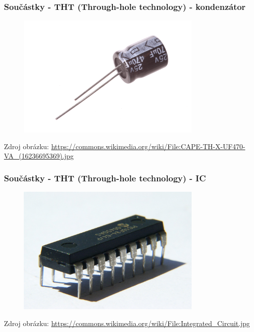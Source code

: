 \documentclass[12;pt,t]{beamer} %
\newcommand{\srctext}[1]{{\fontsize{7}{9}\selectfont\textcolor{sourcesclr}{#1}}}
\begin{document}
\begin{frame}
\frametitle{Součástky - THT (Through-hole technology) - kondenzátor}
\begin{figure}[H]
	\includegraphics[width=0.8\textwidth]{img/CAPE-TH-X-UF470-VA_(16236695369).jpg}
\end{figure}
\srctext{Zdroj obrázku: \url{
		https://commons.wikimedia.org/wiki/File:CAPE-TH-X-UF470-VA_(16236695369).jpg}}
\end{frame}

\begin{frame}
\frametitle{Součástky - THT (Through-hole technology) - IC}
\begin{figure}[H]
	\includegraphics[width=0.8\textwidth]{img/Integrated_Circuit_THT.jpg}
\end{figure}
\srctext{Zdroj obrázku: \url{https://commons.wikimedia.org/wiki/File:Integrated_Circuit.jpg}}
\end{frame}
\end{document}
